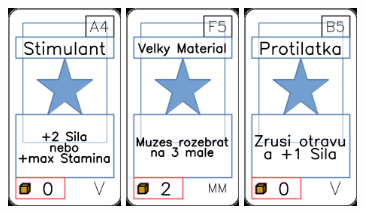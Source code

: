\documentclass[a4paper]{article}
\begin{document}
	\includegraphics[width=3.0cm]{img-1_63}
	\includegraphics[width=3.0cm]{img-1_59}
	\includegraphics[width=3.0cm]{img-1_69}
\end{document}
